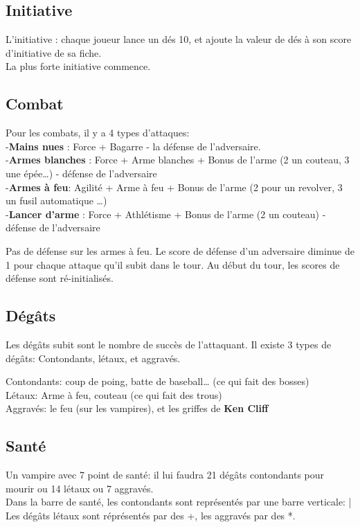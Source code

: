 \documentclass[oneside,12pt]{book}
\begin{document}
\begin{flushleft}
\subsection{Initiative}
L'initiative : chaque joueur lance un dés 10, et ajoute la valeur de dés à son score d'initiative de sa fiche.\\
La plus forte initiative commence.\\
\vspace{0.5cm}

\subsection{Combat}
Pour les combats, il y a 4 types d'attaques:\\
-\textbf{Mains nues} : Force + Bagarre - la défense de l'adversaire.\\
-\textbf{Armes blanches} : Force + Arme blanches + Bonus de l'arme (2 un couteau, 3 une épée…) - défense de l'adversaire\\
-\textbf{Armes à feu}: Agilité + Arme à feu + Bonus de l'arme (2 pour un revolver, 3 un fusil automatique …)\\
-\textbf{Lancer d'arme} : Force + Athlétisme + Bonus de l'arme (2 un couteau) - défense de l'adversaire\\
\vspace{0.5cm}

Pas de défense sur les armes à feu. Le score de défense d'un adversaire diminue de 1 pour chaque attaque qu'il subit dans le tour. Au début du tour, les scores de défense sont ré-initialisés.\\
\vspace{0.5cm}
\subsection{Dégâts}
Les dégâts subit sont le nombre de succès de l'attaquant. Il existe 3 types de dégâts: Contondants, létaux, et aggravés.\\
\vspace{0.5cm}

Contondants: coup de poing, batte de baseball… (ce qui fait des bosses)\\
Létaux: Arme à feu, couteau (ce qui fait des trous)\\
Aggravés: le feu (sur les vampires), et les griffes de \textbf{Ken Cliff}\\

\subsection{Santé}
\vspace{0.5cm}
Un vampire avec 7 point de santé: il lui faudra 21 dégâts contondants pour mourir ou 14 létaux ou 7 aggravés.\\
Dans la barre de santé, les contondants sont représentés par une barre verticale: | \\
Les dégâts létaux sont réprésentés par des +, les aggravés par des *. \\



\end{flushleft}
\end{document}
